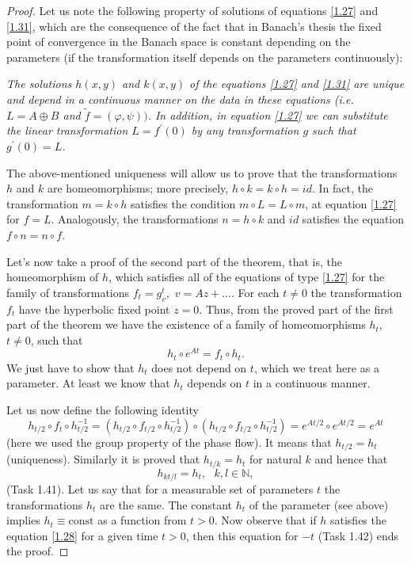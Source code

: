 \begin{theorem}
\begin{proof}
		Let us note the following property of solutions of equations \eqref{1.27} and \eqref{1.31}, which are the consequence of the fact that in Banach's thesis the fixed point of convergence in the Banach space is constant depending on the parameters (if the transformation itself depends on the parameters continuously):
		
		\emph{The solutions $ h (x, y) $ and $ k (x, y) $ of the equations \eqref{1.27} and \eqref{1.31} are unique and depend in a continuous manner on the data in these equations (i.e. $ L = A \oplus B $ and $ \tilde {f} = (\varphi, \psi)) $. In addition, in equation \eqref{1.27} we can substitute the linear transformation $ L = f ^ {\prime} (0) $ by any transformation $ g $ such that $ g ^ {\prime} (0) = L$.}
		
		The above-mentioned uniqueness will allow us to prove that the transformations $ h $ and $ k $ are homeomorphisms; more precisely, $ h \circ k = k \circ h = id $. In fact, the transformation $ m = k \circ h $ satisfies the condition $ m \circ L = L \circ m$, at equation \eqref{1.27} for $ f = L $. Analogously, the transformations $ n = h \circ k $ and $ id $ satisfies the equation $ f \circ n = n \circ f $.
		
		Let's now take a proof of the second part of the theorem, that is, the homeomorphism of $ h $, which satisfies all of the equations of type \eqref{1.27} for the family of transformations $ f_ {t} = g_ {v} ^ {t}, $ $ v = Az + \ldots $. For each $ t \not = 0 $  the transformation $ f_ {t} $  have the hyperbolic fixed point $ z = 0 $. Thus, from the proved part of the first part of the theorem we have the existence of a family of homeomorphisms $ h_ {t} $, $ t \not = 0 $, such that
		$$
		h_{t}\circ e^{At}=f_{t}\circ h_{t}.
		$$
		We just have to show that $ h_ {t} $ does not depend on $ t $, which we treat here as a parameter. At least we know that $ h_ {t} $ depends on $ t $ in a continuous manner.
		
		Let us now define the following identity
		$$
		h_{t/2}\circ f_{t}\circ h_{t/2}^{-1}=\left( h_{t/2}\circ f_{t/2}\circ
		h_{t/2}^{-1}\right) \circ \left( h_{t/2}\circ f_{t/2}\circ
		h_{t/2}^{-1}\right) =e^{At/2}\circ e^{At/2}=e^{At}
		$$
		(here we used the group property of the phase flow). It means that $ h_ {t / 2} = h_ {t} $ (uniqueness). Similarly it is proved that $ h_ {t / k} = h_ {t} $  for natural $ k $  and hence that
		$$
		h_{kt/l}=h_{t},\text{ \ \ }k,l\in \mathbb{N},
		$$
		(Task 1.41). Let us say that for a measurable set of parameters $ t $ the transformations $ h_ {t} $ are the same. The constant $ h_ {t} $ of the parameter (see above) implies $ h_ {t} \equiv \textrm {const} $ as a function from $ t> 0 $. Now observe that if $ h $ satisfies the equation \eqref{1.28} for a given time $ t> 0$, then this equation for $ -t $ (Task 1.42) ends the proof.
		

\end{proof}
\end{theorem}
